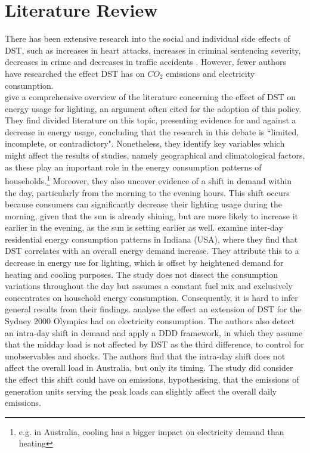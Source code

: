 \section{Literature Review}
There has been extensive research into the social and individual side effects of \ac{DST}, such as increases in heart attacks, increases in criminal sentencing severity, decreases in crime and decreases in traffic accidents \parencite{heart_attacks, sleepy_punishers, doleac_crime, bunnings_traffic}.
However, fewer authors have researched the effect \ac{DST} has on $CO_2$ emissions and electricity consumption. \\
\textcite{aries_effect_2008} give a comprehensive overview of the literature concerning the effect of \ac{DST} on energy usage for lighting, an argument often cited for the adoption of this policy. They find divided literature on this topic, presenting evidence for and against a decrease in energy usage, concluding that the research in this debate is ``limited, incomplete, or contradictory". Nonetheless, they identify key variables which might affect the results of studies, namely geographical and climatological factors, as these play an important role in the energy consumption patterns of households.\footnote{e.g. in Australia, cooling has a bigger impact on electricity demand than heating} Moreover, they also uncover evidence of a shift in demand within the day, particularly from the morning to the evening hours. This shift occurs because consumers can significantly decrease their lighting usage during the morning, given that the sun is already shining, but are more likely to increase it earlier in the evening, as the sun is setting earlier as well.
\textcite{kotchen} examine inter-day residential energy consumption patterns in Indiana (USA), where they find that \ac{DST} correlates with an overall energy demand increase. They attribute this to a decrease in energy use for lighting, which is offset by heightened demand for heating and cooling purposes. The study does not dissect the consumption variations throughout the day but assumes a constant fuel mix and exclusively concentrates on household energy consumption. Consequently, it is hard to infer general results from their findings.
\textcite{kellogg_daylight_2008} analyse the effect  an extension of \ac{DST} for the Sydney 2000 Olympics had on electricity consumption. The authors also detect an intra-day shift in demand and apply a \ac{DDD} framework, in which they assume that the midday load is not affected by \ac{DST} as the third difference, to control for unobservables and shocks. The authors find that the intra-day shift does not affect the overall load in Australia, but only its timing. The study did consider the effect this shift could have on emissions, hypothesising, that the emissions of generation units serving the peak loads can slightly affect the overall daily emissions.
